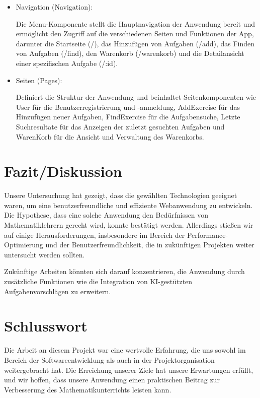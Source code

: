 \documentclass[12pt,a4paper]{article} %
\begin{document}
\begin{itemize}
\item Navigation (Navigation):

Die Menu-Komponente stellt die Hauptnavigation der Anwendung bereit und ermöglicht den Zugriff auf die verschiedenen Seiten und Funktionen der App, darunter die Startseite (/), das Hinzufügen von Aufgaben (/add), das Finden von Aufgaben (/find), den Warenkorb (/warenkorb) und die Detailansicht einer spezifischen Aufgabe (/:id).

\item Seiten (Pages):

Definiert die Struktur der Anwendung und beinhaltet Seitenkomponenten wie User für die Benutzerregistrierung und -anmeldung, AddExercise für das Hinzufügen neuer Aufgaben, FindExercise für die Aufgabensuche, Letzte Suchresultate für das Anzeigen der zuletzt gesuchten Aufgaben und WarenKorb für die Ansicht und Verwaltung des Warenkorbs.

\end{itemize}


\section{Fazit/Diskussion}
Unsere Untersuchung hat gezeigt, dass die gewählten Technologien geeignet waren, um eine benutzerfreundliche und effiziente Webanwendung zu entwickeln. Die Hypothese, dass eine solche Anwendung den Bedürfnissen von Mathematiklehrern gerecht wird, konnte bestätigt werden. Allerdings stießen wir auf einige Herausforderungen, insbesondere im Bereich der Performance-Optimierung und der Benutzerfreundlichkeit, die in zukünftigen Projekten weiter untersucht werden sollten.

Zukünftige Arbeiten könnten sich darauf konzentrieren, die Anwendung durch zusätzliche Funktionen wie die Integration von KI-gestützten Aufgabenvorschlägen zu erweitern.

\section{Schlusswort}
Die Arbeit an diesem Projekt war eine wertvolle Erfahrung, die uns sowohl im Bereich der Softwareentwicklung als auch in der Projektorganisation weitergebracht hat. Die Erreichung unserer Ziele hat unsere Erwartungen erfüllt, und wir hoffen, dass unsere Anwendung einen praktischen Beitrag zur Verbesserung des Mathematikunterrichts leisten kann.

\newpage
   
  
\appendix
\end{document}
